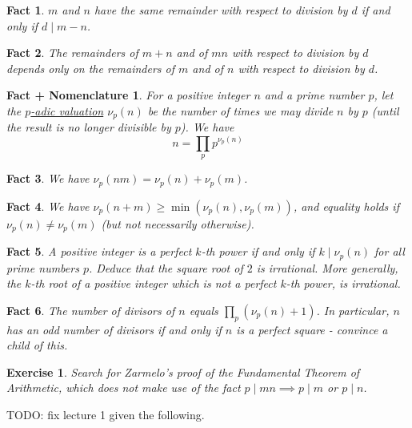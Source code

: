 \documentclass[12pt]{article}
\newtheorem*{fact*}{Fact}
\newtheorem*{fact_plus_nomn*}{Fact + Nomenclature}
\newtheorem*{exer*}{Exercise}
\begin{document}
\begin{fact*}
$m$ and $n$ have the same remainder with respect to division by $d$ if and only if $d \mid m-n$.    
\end{fact*}


\begin{fact*}
The remainders of $m+n$ and of $mn$ with respect to division by $d$ depends only on the remainders of $m$ and of $n$ with respect to division by $d$. 
\end{fact*}


\begin{fact_plus_nomn*}
For a positive integer $n$ and a prime number $p$, let the \underline{$p$-adic valuation} $\nu_p(n)$ be the number of times we may divide $n$ by $p$ (until the result is no longer divisible by $p$). 
We have \[ n = \prod_{p} p^{\nu_p(n)} \]
\end{fact_plus_nomn*}


\begin{fact*}
We have $\nu_p(nm) = \nu_p(n) + \nu_p(m)$.
\end{fact*}


\begin{fact*}
We have $\nu_p(n + m) \ge \min(\nu_p(n), \nu_p(m))$, and equality holds if $\nu_p(n) \neq \nu_p(m)$ (but not necessarily otherwise).
\end{fact*}


\begin{fact*}
A positive integer is a perfect $k$-th power if and only if $k\mid \nu_p(n)$ for all prime numbers $p$. Deduce that the square root of $2$ is irrational. More generally, the $k$-th root of a positive integer which is not a perfect $k$-th power, is irrational.
\end{fact*}


\begin{fact*}
The number of divisors of $n$ equals $\prod_p (\nu_p(n) + 1)$. In particular, $n$ has an odd number of divisors if and only if $n$ is a perfect square - convince a child of this.
\end{fact*}


\begin{exer*}
Search for Zarmelo's proof of the Fundamental Theorem of Arithmetic, which does not make use of the fact $p\mid mn\implies p\mid m$ or $p \mid n$.
\end{exer*}


\newpage


TODO: fix lecture 1 given the following.\\
\end{document}

